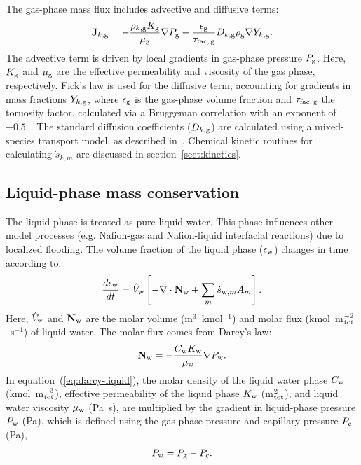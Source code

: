 \documentclass[final,3p,times,twocolumn]{elsarticle}    %
\begin{document}
The gas-phase mass flux includes advective and diffusive terms: 
\begin{equation} \label{eq:mass-flux}
    \mathbf{J}_{k,\rm g} = -\frac{\rho_{k,\rm g} K_{\rm g}}{\mu_{\rm g}} \nabla P_{\rm g} 
                  -\frac{\epsilon_{\rm g}}{\tau_{\rm fac,\,g}} D_{k,\rm g} 
                   \rho_{\rm g} \nabla Y_{k,\rm g}.
\end{equation}
The advective term is driven by local gradients in gas-phase pressure $P_{\rm g}$. Here, $K_{\rm g}$ and $\mu_{\rm g}$ are the effective permeability and viscosity of the gas phase, respectively. Fick's law is used for the diffusive term, accounting for gradients in mass fractions $Y_{k,\rm g}$, where $\epsilon_{\rm g}$ is the gas-phase volume fraction and $\tau_{\rm fac,\,g}$ the toruosity factor, calculated via a Bruggeman correlation with an exponent of $-0.5$~\cite{bib:bruggeman_1935}. The standard diffusion coefficients ($D_{k,\rm g}$) are calculated using a mixed-species transport model, as described in~\cite{bib:kee_2018}. Chemical kinetic routines for calculating $\dot{s}_{k,m}$ are discussed in section~\ref{sect:kinetics}.

\subsection{Liquid-phase mass conservation}

The liquid phase is treated as pure liquid water. This phase influences other model processes (e.g. Nafion-gas and Nafion-liquid interfacial reactions) due to localized flooding. The volume fraction of the liquid phase ($\epsilon_{\rm w}$) changes in time according to:
\begin{equation}\label{eq:volfrac_w}
    \frac{d \epsilon_{\rm w}}{d t} = \hat{V}_{\rm w} \left[ 
    - \nabla \cdot {\bf N}_{\rm w} + \sum_m \dot{s}_{{\rm w},m} A_m \right].
\end{equation}
Here, $\hat{V}_{\rm w}$ and ${\bf N}_{\rm w}$ are the molar volume (m$^3$~kmol$^{-1}$) and molar flux (kmol~m$^{-2}_{\rm tot}$~s$^{-1}$) of liquid water. The molar flux comes from Darcy's law:
\begin{equation} \label{eq:darcy-liquid}
    {\bf N}_{\rm w} = -\frac{C_{\rm w} K_{\rm w}}{\mu_{\rm w}} \nabla P_{\rm w}.
\end{equation}
In equation~(\ref{eq:darcy-liquid}), the molar density of the liquid water phase $C_{\rm w}$ (kmol~m$^{-3}_{\rm tot}$), effective permeability of the liquid phase $K_{\rm w}$ (m$^{2}_{\rm tot}$), and liquid water viscosity $\mu_{\rm w}$ (Pa~s), are multiplied by the gradient in liquid-phase pressure $P_{\rm w}$ (Pa), which is defined using the gas-phase pressure and capillary pressure $P_{\rm c}$ (Pa),
\begin{equation}
    P_{\rm w} = P_{\rm g} - P_{\rm c}.
\end{equation}
\end{document}
